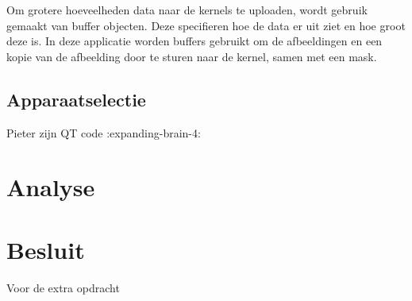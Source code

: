 \documentclass[twocolumn, a4paper]{article}
\begin{document}
Om grotere hoeveelheden data naar de kernels te uploaden, wordt gebruik gemaakt van buffer objecten. Deze specifieren hoe de data er uit ziet en hoe groot deze is. In deze applicatie worden buffers gebruikt om de afbeeldingen en een kopie van de afbeelding door te sturen naar de kernel, samen met een mask.

\subsection{Apparaatselectie}
Pieter zijn QT code :expanding-brain-4:

\section{Analyse}

\section{Besluit}
Voor de extra opdracht 

\onecolumn

\appendix




\newpage

\end{document}
